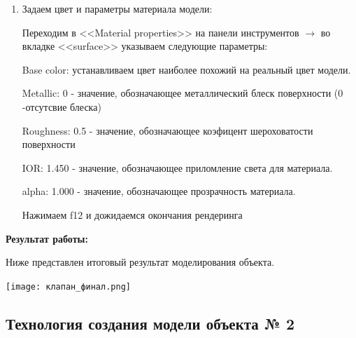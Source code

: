 \documentclass[12pt]{article}
\begin{document}
\begin{enumerate}
\item Задаем цвет и параметры материала модели:

Переходим в <<Material properties>> на панели инструментов $\to $ во вкладке <<surface>> указываем следующие параметры:

Base color:  устанавливаем цвет наиболее похожий на реальный цвет модели.

Metallic: 0  -  значение, обозначающее металлический блеск поверхности (0 -отсутсвие блеска)

Roughness: 0.5  - значение, обозначающее коэфицент шероховатости поверхности

IOR:  1.450 - значение, обозначающее приломление света для материала. 

alpha: 1.000 - значение, обозначающее  прозрачность материала.


Нажимаем f12 и дожидаемся окончания рендеринга
\end{enumerate}


{\bf Результат работы:}


Ниже представлен итоговый результат моделирования объекта.


\vskip 1cm
{
    \centering
    \texttt{[image: клапан\_финал.png]}
    \label{fig:i1}
}
\vskip 1cm

    
    
    
    
    
    
    
    
    
    
    
    
    
    
    
\subsection{Технология создания модели объекта № 2}
\end{document}
